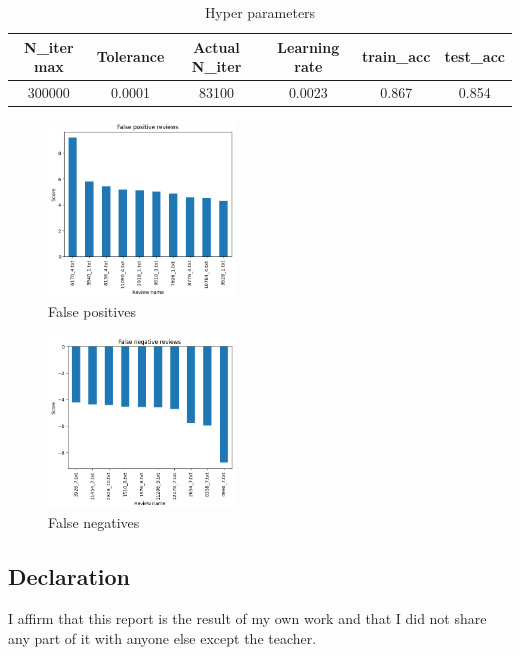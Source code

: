 \documentclass{article}
\begin{document}
    \begin{table}[H]
        \centering
        \caption{\small Hyper parameters}
        \label{tab:hyper_lr}
        \begin{tabular}{ |c|c|c|c|c|c|} 
        \hline
        \textbf{N\_iter max} & \textbf{Tolerance} & \textbf{Actual N\_iter} & \textbf{Learning rate} & \textbf{train\_acc} & \textbf{test\_acc}\\ \hline
        300000 & 0.0001 & 83100 & 0.0023 & 0.867 & 0.854 \\ \hline
        \end{tabular}
    \end{table}


    \begin{multicols}{2}

        \begin{figure}[H]
            \centering
            \includegraphics[width=0.44\textwidth]{false_positives_lr.png}
            \caption{\small False positives}
            \label{fig:falseposlr}
        \end{figure}
    
        \begin{figure}[H]
            \centering
            \includegraphics[width=0.44\textwidth]{false negatives_lr.png}
            \caption{\small False negatives}
            \label{fig:falseneglr}
        \end{figure}
    
    \end{multicols}


\vfill
\subsection*{\normalsize Declaration}
I aﬃrm that this report is the result of my own work and that I did not share any part of it with anyone else except the teacher.

\end{document}
